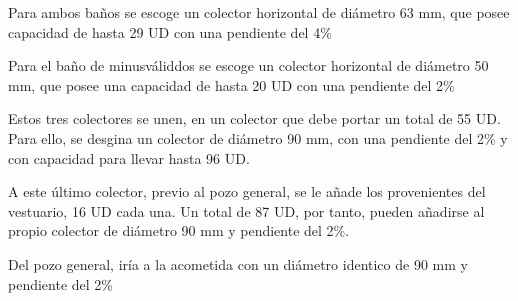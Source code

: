 \documentclass[../main.tex]{subfiles}
\begin{document}
Para ambos baños se escoge un colector horizontal de diámetro 63 mm, que posee capacidad de hasta 29 UD con una pendiente del 4\%

Para el baño de minusváliddos se escoge un colector horizontal de diámetro 50 mm, que posee una capacidad de hasta 20 UD con una pendiente del 2\%

Estos tres colectores se unen, en un colector que debe portar un total de 55 UD. Para ello, se desgina un colector de diámetro 90 mm, con una pendiente del 2\% y con capacidad para llevar hasta 96 UD.

A este último colector, previo al pozo general, se le añade los provenientes del vestuario, 16 UD cada una. Un total de 87 UD, por tanto, pueden añadirse al propio colector de diámetro 90 mm y pendiente del 2\%. 

Del pozo general, iría a la acometida con un diámetro identico de 90 mm y pendiente del 2\%
\end{document}
